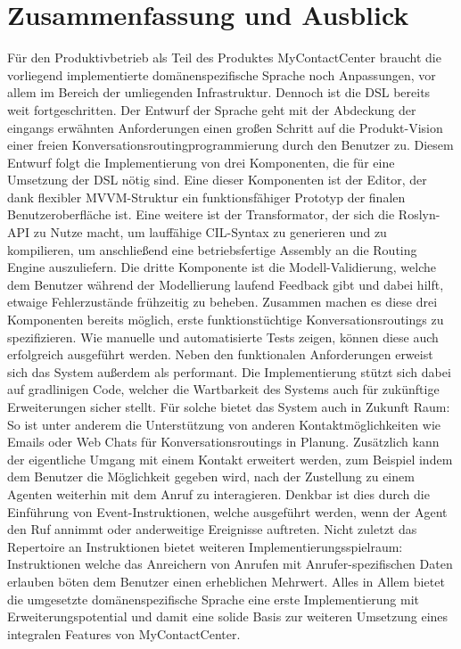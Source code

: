 \chapter{Zusammenfassung und Ausblick}
Für den Produktivbetrieb als Teil des Produktes MyContactCenter braucht die vorliegend implementierte domänenspezifische Sprache noch Anpassungen, vor allem im Bereich der umliegenden Infrastruktur. 
Dennoch ist die DSL bereits weit fortgeschritten. Der Entwurf der Sprache geht mit der Abdeckung der eingangs erwähnten Anforderungen einen großen Schritt auf die Produkt-Vision einer freien Konversationsroutingprogrammierung durch den Benutzer zu. Diesem Entwurf folgt die Implementierung von drei Komponenten, die für eine Umsetzung der DSL nötig sind. Eine dieser Komponenten ist der Editor, der dank flexibler MVVM-Struktur ein funktionsfähiger Prototyp der finalen Benutzeroberfläche ist. Eine weitere ist der Transformator, der sich die Roslyn-API zu Nutze macht, um lauffähige CIL-Syntax zu generieren und zu kompilieren, um anschließend eine betriebsfertige Assembly an die Routing Engine auszuliefern. Die dritte Komponente ist die  Modell-Validierung, welche dem Benutzer während der Modellierung laufend Feedback gibt und dabei hilft, etwaige Fehlerzustände frühzeitig zu beheben. 
\newline
Zusammen machen es diese drei Komponenten bereits möglich, erste funktionstüchtige Konversationsroutings zu spezifizieren. Wie manuelle und automatisierte Tests zeigen, können diese auch erfolgreich ausgeführt werden. Neben den funktionalen Anforderungen erweist sich das System außerdem als performant. Die Implementierung stützt sich dabei auf gradlinigen Code, welcher die Wartbarkeit des Systems auch für zukünftige Erweiterungen sicher stellt. 
\newline
Für solche bietet das System auch in Zukunft Raum: So ist unter anderem die Unterstützung von anderen Kontaktmöglichkeiten wie Emails oder Web Chats für Konversationsroutings in Planung. Zusätzlich kann der eigentliche Umgang mit einem Kontakt erweitert werden, zum Beispiel indem dem Benutzer die Möglichkeit gegeben wird, nach der Zustellung zu einem Agenten weiterhin mit dem Anruf zu interagieren. Denkbar ist dies durch die Einführung von Event-Instruktionen, welche ausgeführt werden, wenn der Agent den Ruf annimmt oder anderweitige Ereignisse auftreten. Nicht zuletzt das Repertoire an Instruktionen bietet weiteren Implementierungsspielraum: Instruktionen welche das Anreichern von Anrufen mit Anrufer-spezifischen Daten erlauben böten dem Benutzer einen erheblichen Mehrwert. Alles in Allem bietet die umgesetzte domänenspezifische Sprache eine erste Implementierung mit Erweiterungspotential und damit eine solide Basis zur weiteren Umsetzung eines integralen Features von MyContactCenter.